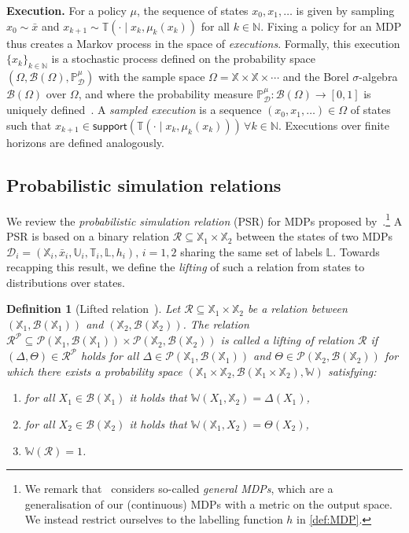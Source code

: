 \documentclass[letterpaper, 10 pt, conference]{ieeeconf}  %
\newtheorem{definition}{Definition}
\newcommand*{\policy}{\ensuremath{\mu}}
\newcommand*{\States}{\ensuremath{\mathbb{X}}}
\newcommand*{\Actions}{\ensuremath{\mathbb{U}}}
\newcommand*{\Labels}{\ensuremath{\mathbb{L}}}
\newcommand*{\initState}{\ensuremath{\bar{x}}}
\newcommand*{\transfunc}{\ensuremath{\mathbb{T}}}
\newcommand*{\labelfunc}{\ensuremath{h}}
\newcommand*{\mdp}{\ensuremath{\mathcal{D}}}
\newcommand*{\MDPi}[1]{\ensuremath{\tuple{\States_{#1},{\initState}_{#1},\Actions_{#1},\transfunc_{#1},\Labels,\labelfunc_{#1}}}}
\newcommand*{\NN}{\mathbb{N}}
\newcommand*{\tuple}[1]{\left(#1\right)}
\newcommand*{\support}[1]{\textsf{support}(#1)}
\newcommand*{\Relation}{\mathcal{R}}
\newcommand*{\liftRelation}{\mathcal{R}^\mathcal{P}}
\newcommand*{\Prob}{\mathbb{P}}
\newcommand*{\distr}[1]{\mathcal{P}(#1)}
\newcommand*{\Borel}[1]{\ensuremath{\mathcal{B}(#1)}}
\begin{document}
\textbf{Execution.}
For a policy $\policy$, the sequence of states $x_0, x_1, \ldots$ is given by sampling $x_0 \sim \initState$ and $x_{k+1} \sim \transfunc(\cdot \mid x_k, \mu_k(x_k))$ for all $k \in \NN$.
Fixing a policy for an MDP thus creates a Markov process in the space of \emph{executions}.
Formally, this execution $\{ x_k \}_{k \in \NN}$ is a stochastic process defined on the probability space $(\Omega, \Borel{\Omega}, \Prob_{\mdp}^{\policy})$ with the sample space $\Omega = \States \times \States \times \cdots$ and the Borel $\sigma$-algebra $\Borel{\Omega}$ over $\Omega$, and where the probability measure $\Prob_{\mdp}^{\policy} \colon \Borel{\Omega} \to [0,1]$ is uniquely defined~\cite[Proposition~7.45]{Bertsekas.Shreve78}.
A \emph{sampled execution} is a sequence $(x_0, x_1, \ldots) \in \Omega$ of states such that $x_{k+1} \in \support{\transfunc(\cdot \mid x_k, \policy_k(x_k))} \,\forall k \in \NN$.
Executions over finite horizons are defined analogously.

\subsection{Probabilistic simulation relations}
We review the \emph{probabilistic simulation relation} (PSR) for MDPs proposed by~\cite{DBLP:journals/siamco/HaesaertSA17}.\footnote{We remark that~\cite{DBLP:journals/siamco/HaesaertSA17} considers so-called \emph{general MDPs}, which are a generalisation of our (continuous) MDPs with a metric on the output space. We instead restrict ourselves to the labelling function $\labelfunc$ in \cref{def:MDP}.}
A PSR is based on a binary relation {$\Relation \subseteq \States_1 \times \States_2$} between the states of two MDPs $\mdp_i = \MDPi{i}, \, i=1,2$ sharing the same set of labels $\Labels$.
Towards recapping this result, we define the \emph{lifting} of such a relation from states to distributions over states.

\begin{definition}[Lifted relation~\cite{DBLP:journals/siamco/HaesaertSA17}]
    \label{def:lifting}
    Let $\Relation \subseteq \States_1 \times \States_2$ be a relation between $(\States_1, \Borel{\States_1})$ and $(\States_2, \Borel{\States_2})$.
    The relation $\liftRelation \subseteq \distr{\States_1, \Borel{\States_1}} \times \distr{\States_2, \Borel{\States_2}}$ is called a \emph{lifting of relation $\Relation$} if $(\Delta, \Theta) \in \liftRelation$ holds for all $\Delta \in \distr{\States_1, \Borel{\States_1}}$ and $\Theta \in \distr{\States_2, \Borel{\States_2}}$ for which there exists a probability space $(\States_1 \times \States_2, \Borel{\States_1 \times \States_2}, \mathbb{W})$ satisfying:
    \begin{enumerate}
        \item for all $X_1 \in \Borel{\States_1}$ it holds that $\mathbb{W}(X_1, \States_2) = \Delta(X_1)$,
        \item for all $X_2 \in \Borel{\States_2}$ it holds that $\mathbb{W}(\States_1, X_2) = \Theta(X_2)$,
        \item $\mathbb{W}(\Relation) = 1$.
    \end{enumerate}
\end{definition}
\end{document}
